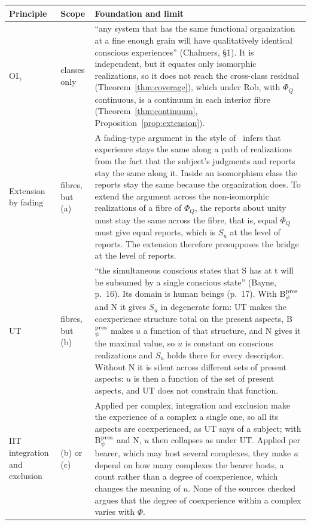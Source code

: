 \begin{table}[htbp]\centering\footnotesize
\begin{tabular}{>{\raggedright\arraybackslash}p{}>{\raggedright\arraybackslash}p{}>{\raggedright\arraybackslash}p{}}
\toprule
Principle & Scope & Foundation and limit\\
\midrule
OI$_\gamma$~\cite{Chalmers1995} & classes only & ``any system that has the same functional organization at a fine enough grain will have qualitatively identical conscious experiences'' (Chalmers, §1). It is independent, but it equates only isomorphic realizations, so it does not reach the cross-class residual (Theorem~\ref{thm:coverage}), which under Rob, with $\Phi_Q$ continuous, is a continuum in each interior fibre (Theorem~\ref{thm:continuum}, Proposition~\ref{prop:extension}).\\
Extension by fading & fibres, but (a) & A fading-type argument in the style of~\cite{Chalmers1995} infers that experience stays the same along a path of realizations from the fact that the subject's judgments and reports stay the same along it. Inside an isomorphism class the reports stay the same because the organization does. To extend the argument across the non-isomorphic realizations of a fibre of $\Phi_Q$, the reports about unity must stay the same across the fibre, that is, equal $\Phi_Q$ must give equal reports, which is $S_u$ at the level of reports. The extension therefore presupposes the bridge at the level of reports.\\
UT~\cite{Bayne2010,BayneChalmers2003} & fibres, but (b) & ``the simultaneous conscious states that S has at t will be subsumed by a single conscious state'' (Bayne, p.~16). Its domain is human beings (p.~17). With B$_\psi^{\rm pres}$ and N it gives $S_u$ in degenerate form: UT makes the coexperience structure total on the present aspects, B$_\psi^{\rm pres}$ makes $u$ a function of that structure, and N gives it the maximal value, so $u$ is constant on conscious realizations and $S_u$ holds there for every descriptor. Without N it is silent across different sets of present aspects: $u$ is then a function of the set of present aspects, and UT does not constrain that function.\\
IIT integration and exclusion~\cite{Oizumi2014} & (b) or (c) & Applied per complex, integration and exclusion make the experience of a complex a single one, so all its aspects are coexperienced, as UT says of a subject; with B$_\psi^{\rm pres}$ and N, $u$ then collapses as under UT. Applied per bearer, which may host several complexes, they make $u$ depend on how many complexes the bearer hosts, a count rather than a degree of coexperience, which changes the meaning of $u$. None of the sources checked argues that the degree of coexperience within a complex varies with $\Phi$.\\

\end{tabular}
\end{table}
